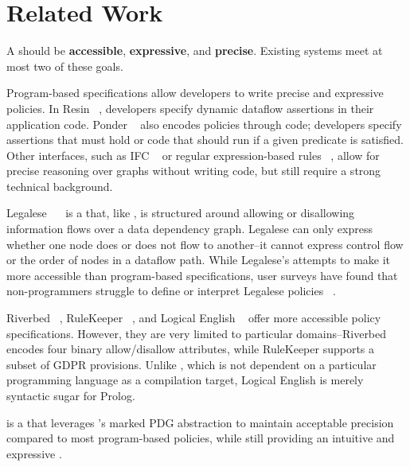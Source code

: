 \chapter{Related Work}

A \policylang{} should be \textbf{accessible}, \textbf{expressive}, and \textbf{precise}.
%
Existing systems meet at most two of these goals.
%

Program-based specifications allow developers to write precise and expressive policies.
%
In Resin ~\cite{resin}, developers specify dynamic dataflow assertions in their application code.
%
Ponder ~\cite{ponder} also encodes policies through code; developers specify assertions that must hold or code that should run if a given predicate is satisfied.
%
Other interfaces, such as IFC ~\cite{jif} or regular expression-based rules ~\cite{hotnets}, 
allow for precise reasoning over graphs without writing code, but still require a strong technical background.

Legalese ~~\cite{legalese} is a \policylang{} that, like \syslang, is structured around allowing or disallowing information flows over a data dependency graph.
%
Legalese can only express whether one node does or does not flow to another--it cannot express control flow or the order of nodes in a dataflow path.
%
%
While Legalese's  attempts to make it more accessible than program-based specifications, 
user surveys have found that non-programmers struggle to define or interpret Legalese policies ~\cite{legalese, privguard}. 

Riverbed ~\cite{riverbed}, RuleKeeper ~\cite{rulekeeper}, and Logical English ~\cite{logical-english} offer more accessible policy specifications.
%
However, they are very limited to particular domains--Riverbed encodes four binary allow/disallow attributes, while RuleKeeper supports a subset of GDPR provisions.
%
Unlike \syslang, which is not dependent on a particular programming language as a compilation target, Logical English is merely syntactic sugar for Prolog.

\syslang{} is a \policylang{} that leverages \sys{}'s marked PDG abstraction to maintain acceptable precision compared to most program-based policies,
while still providing an intuitive and expressive .